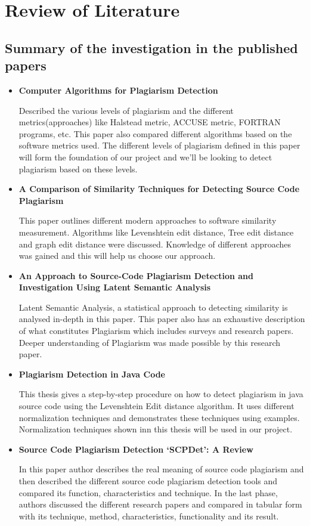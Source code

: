 	\chapter{Review of Literature }
	\section{Summary of the investigation in the published papers}
	
	\begin{itemize}
	\item \textbf{Computer Algorithms for Plagiarism Detection}
	
	Described the various levels of plagiarism and the different metrics(approaches) like Halstead metric, ACCUSE metric, FORTRAN programs, etc. This paper also compared different algorithms based on the software metrics used. The different levels of plagiarism defined in this paper will form the foundation of our project and we’ll be looking to detect plagiarism based on these levels.
	
	
	\item \textbf{A Comparison of Similarity Techniques for Detecting Source Code Plagiarism}
	
	This paper outlines different modern approaches to software similarity measurement. Algorithms like Levenshtein edit distance, Tree edit distance and graph edit distance were discussed. Knowledge of different approaches was gained and this will help us choose our approach.
	
	\item  \textbf{An Approach to Source-Code Plagiarism Detection and Investigation Using Latent Semantic Analysis}
	
	Latent Semantic Analysis, a statistical approach to detecting similarity is analysed in-depth in this paper. This paper also has an exhaustive description of what constitutes Plagiarism which includes surveys and research papers. Deeper understanding of Plagiarism was made possible by this research paper.
	
	\item  \textbf{Plagiarism Detection in Java Code}
	
	This thesis gives a step-by-step procedure on how to detect plagiarism in java source code using the Levenshtein Edit distance algorithm. It uses different normalization techniques and demonstrates these techniques using examples. Normalization techniques shown inn this thesis will be used in our project.
	
	\item \textbf{Source Code Plagiarism Detection ‘SCPDet’: A Review}
	
	In this paper author describes the real meaning of source code plagiarism and  then described the different source code plagiarism detection tools and compared its function, characteristics and technique. In the last phase, authors discussed the different research papers and compared in tabular form with its technique, method, characteristics, functionality and its result.
	
	\end{itemize} 
	
